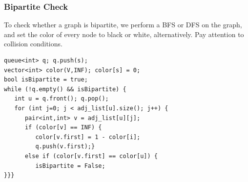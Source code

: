 \documentclass{beamer}
\begin{document}
\begin{frame}[fragile]
  \frametitle{Bipartite Check}
  {\smaller
  To check whether a graph is bipartite, we perform a BFS or DFS on the graph, 
  and set the color of every node to black or white, alternatively. Pay 
  attention to collision conditions.

  \begin{exampleblock}{}
\begin{verbatim}
queue<int> q; q.push(s);
vector<int> color(V,INF); color[s] = 0;
bool isBipartite = true;
while (!q.empty() && isBipartite) {
   int u = q.front(); q.pop();
   for (int j=0; j < adj_list[u].size(); j++) {
      pair<int,int> v = adj_list[u][j];
      if (color[v] == INF) {
         color[v.first] = 1 - color[i];
         q.push(v.first);}
      else if (color[v.first] == color[u]) {
         isBipartite = False; 
}}}
\end{verbatim}
  \end{exampleblock}
  }
\end{frame}
\end{document}
